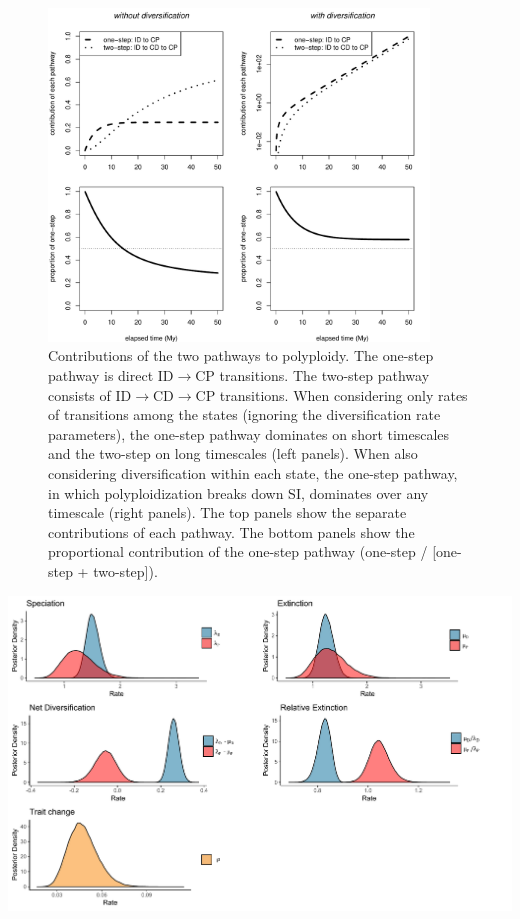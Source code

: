 \begin{figure}
    \centering \includegraphics[width=0.9\textwidth]{pathways}
    \caption{
        Contributions of the two pathways to polyploidy.
        The one-step pathway is direct ID$\rightarrow$CP transitions.
        The two-step pathway consists of ID$\rightarrow$CD$\rightarrow$CP transitions.
        When considering only rates of transitions among the states (ignoring the diversification rate parameters), the one-step pathway dominates on short timescales and the two-step on long timescales (left panels).
        When also considering diversification within each state, the one-step pathway, in which polyploidization breaks down SI, dominates over any timescale (right panels).
        The top panels show the separate contributions of each pathway.
        The bottom panels show the proportional contribution of the one-step pathway (\ie one-step / [one-step + two-step]).
    }
    \label{figure:pathways}
\end{figure}

\begin{suppfigure}
\includegraphics[width=\textwidth]{bisseDPnodipposteriordist.pdf}
\caption{Posterior distribution for each of the parameters in the D/P, polyploidy model} %
\label{suppfigure:DPnodip}
\end{suppfigure}

